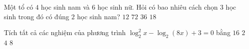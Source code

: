 \begin{ex}%
	Một tổ có $4$ học sinh nam và $6$ học sinh nữ. Hỏi có bao nhiêu cách chọn $3$ học sinh trong đó có đúng $2$ học sinh nam?
	\choice
	{$12$}
	{$72$}
	{\True $36$}
	{$18$}
\end{ex}

\begin{ex}%
	Tích tất cả các nghiệm của phương trình $\log _2^2 x-\log_2(8x)+3=0$ bằng
	\choice
	{$16$}
	{\True $2$}
	{$4$}
	{$8$}
\end{ex}

